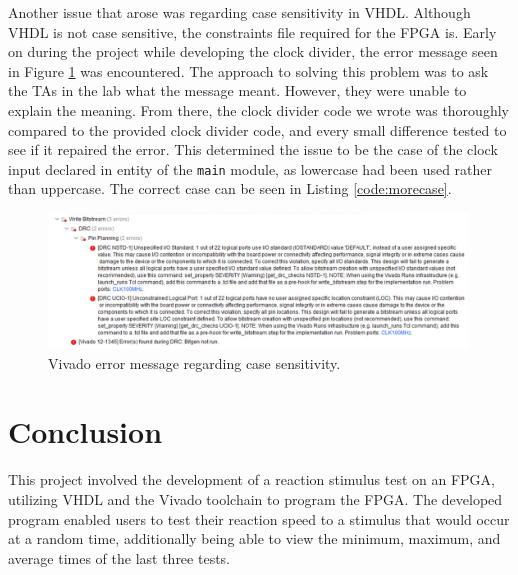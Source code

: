 \documentclass[11pt]{article}
\begin{document}
Another issue that arose was regarding case sensitivity in VHDL. Although VHDL is not case sensitive, the constraints file required for the FPGA is. Early on during the project while developing the clock divider, the error message seen in Figure \ref{fig:error} was encountered. The approach to solving this problem was to ask the TAs in the lab what the message meant. However, they were unable to explain the meaning. From there, the clock divider code we wrote was thoroughly compared to the provided clock divider code, and every small difference tested to see if it repaired the error. This determined the issue to be the case of the clock input declared in entity of the \texttt{main} module, as lowercase had been used rather than uppercase. The correct case can be seen in Listing \ref{code:morecase}.

\begin{figure}[H]
	\centering
	\includegraphics[width=0.99\textwidth]{error.png}
	\caption{Vivado error message regarding case sensitivity.}
	\label{fig:error}
\end{figure}

\section{Conclusion}


This project involved the development of a reaction stimulus test on an FPGA, utilizing VHDL and the Vivado toolchain to program the FPGA. The developed program enabled users to test their reaction speed to a stimulus that would occur at a random time, additionally being able to view the minimum, maximum, and average times of the last three tests.
\end{document}
